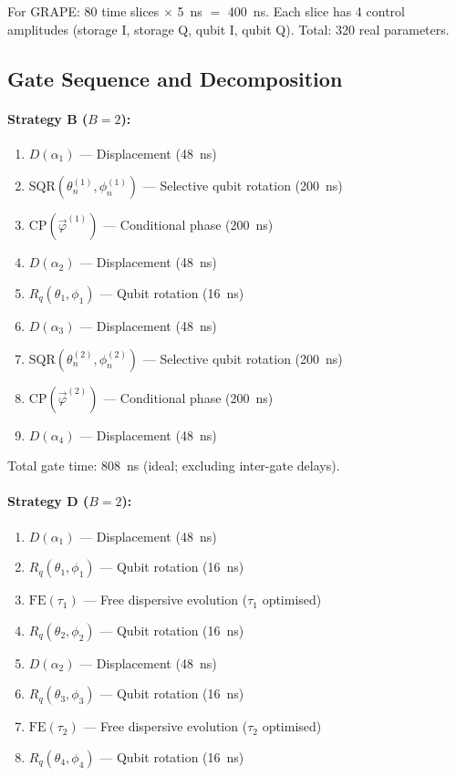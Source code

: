 \documentclass[aps,pra,twocolumn,reprint,floatfix,amsmath,amssymb]{revtex4-2}
\begin{document}
For GRAPE: 80 time slices $\times$ \SI{5}{ns} $=$ \SI{400}{ns}.
Each slice has 4 control amplitudes (storage I, storage Q,
qubit I, qubit Q).  Total: 320 real parameters.

\subsection{Gate Sequence and Decomposition}

\paragraph{Strategy B ($B=2$):}
\begin{enumerate}
  \item $D(\alpha_1)$ --- Displacement (\SI{48}{ns})
  \item $\mathrm{SQR}(\theta_n^{(1)},\phi_n^{(1)})$ --- Selective qubit rotation (\SI{200}{ns})
  \item $\mathrm{CP}(\vec\varphi^{(1)})$ --- Conditional phase (\SI{200}{ns})
  \item $D(\alpha_2)$ --- Displacement (\SI{48}{ns})
  \item $R_q(\theta_1,\phi_1)$ --- Qubit rotation (\SI{16}{ns})
  \item $D(\alpha_3)$ --- Displacement (\SI{48}{ns})
  \item $\mathrm{SQR}(\theta_n^{(2)},\phi_n^{(2)})$ --- Selective qubit rotation (\SI{200}{ns})
  \item $\mathrm{CP}(\vec\varphi^{(2)})$ --- Conditional phase (\SI{200}{ns})
  \item $D(\alpha_4)$ --- Displacement (\SI{48}{ns})
\end{enumerate}
Total gate time: \SI{808}{ns} (ideal; excluding inter-gate delays).

\paragraph{Strategy D ($B=2$):}
\begin{enumerate}
  \item $D(\alpha_1)$ --- Displacement (\SI{48}{ns})
  \item $R_q(\theta_1,\phi_1)$ --- Qubit rotation (\SI{16}{ns})
  \item $\mathrm{FE}(\tau_1)$ --- Free dispersive evolution ($\tau_1$ optimised)
  \item $R_q(\theta_2,\phi_2)$ --- Qubit rotation (\SI{16}{ns})
  \item $D(\alpha_2)$ --- Displacement (\SI{48}{ns})
  \item $R_q(\theta_3,\phi_3)$ --- Qubit rotation (\SI{16}{ns})
  \item $\mathrm{FE}(\tau_2)$ --- Free dispersive evolution ($\tau_2$ optimised)
  \item $R_q(\theta_4,\phi_4)$ --- Qubit rotation (\SI{16}{ns})
\end{enumerate}
\end{document}
